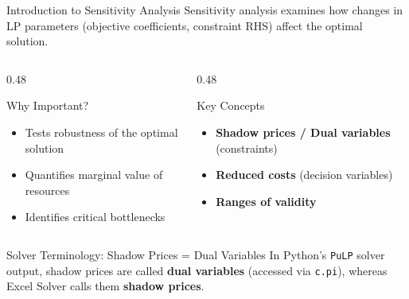 \documentclass{beamer}
\begin{document}
\begin{frame}{Introduction to Sensitivity Analysis}
Sensitivity analysis examines how changes in LP parameters (objective coefficients, constraint RHS) affect the optimal solution.

\vspace{0.2em}
\begin{columns}[T]
\begin{column}{0.48\textwidth}
\begin{block}{Why Important?}
\small
\begin{itemize}\setlength{\itemsep}{0.2em}
  \item Tests robustness of the optimal solution
  \item Quantifies marginal value of resources
  \item Identifies critical bottlenecks
\end{itemize}
\end{block}
\end{column}

\begin{column}{0.48\textwidth}
\begin{block}{Key Concepts}
\small
\begin{itemize}\setlength{\itemsep}{0.2em}
  \item \textbf{Shadow prices / Dual variables} (constraints)
  \item \textbf{Reduced costs} (decision variables)
  \item \textbf{Ranges of validity}
\end{itemize}
\end{block}
\end{column}
\end{columns}

\vspace{0.3em}
\begin{exampleblock}{Solver Terminology: Shadow Prices = Dual Variables}
\small In Python's \texttt{PuLP} solver output, shadow prices are called \textbf{dual variables} (accessed via \texttt{c.pi}), whereas Excel Solver calls them \textbf{shadow prices}.
\end{exampleblock}
\end{frame}
\end{document}
